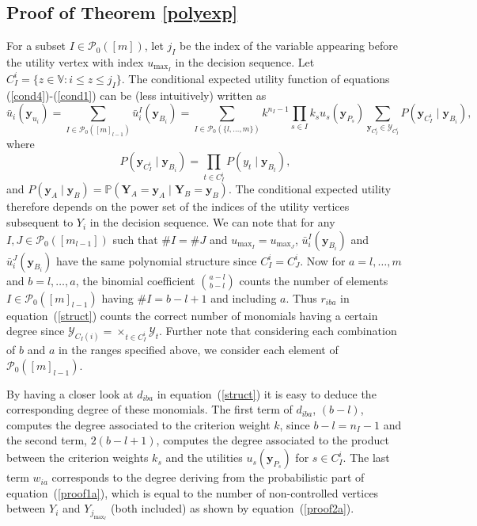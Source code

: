 \subsection{Proof of Theorem \ref{polyexp}}
\label{proof:polyexp}
For a subset $I\in \mathcal{P}_0([m])$, let $j_I$ be the index of the variable appearing before the utility vertex with index $u_{\max_{I}}$ in the decision sequence. Let $C_I^i=\{z\in\mathbb{V}:i\leq z\leq j_I\}$. The conditional expected utility function  of equations (\ref{cond4})-(\ref{cond1}) can be (less intuitively) written as
\begin{equation}
\label{proof1a}
\bar{u}_i(\bm{y}_{u_i})=\sum_{I\in \mathcal{P}_0([m]_{l-1})}\bar{u}_i^I(\bm{y}_{B_i})=\sum_{I\in \mathcal{P}_0(\{l,\dots,m\})}k^{n_I-1}\prod_{s\in I}k_su_s(\bm{y}_{P_s})\sum_{\bm{y}_{C_I^i}\in\bm{\mathcal{Y}}_{C_I^i}}P(\bm{y}_{C_I^i}\;|\;\bm{y}_{B_i}),
\end{equation}
where
\begin{equation}
\label{proof2a}
P(\bm{y}_{C_I^i}\;|\;\bm{y}_{B_i})=\prod_{t\in C_I^i}P(y_t\;|\;\bm{y}_{B_t}),
\end{equation}
and $P(\bm{y}_A\;|\;\bm{y}_B)=\mathbb{P}(\bm{Y}_A=\bm{y}_A\;|\;\bm{Y}_B=\bm{y}_B)$.
The conditional expected utility therefore depends on the power set of the indices of the utility vertices subsequent to $Y_i$ in the decision sequence. We can note that for any $I,J\in \mathcal{P}_0([m_{l-1}])$ such that $\# I=\# J$ and $u_{\max_{I}}=u_{\max_{J}}$, $\bar{u}_i^I(\bm{y}_{B_i})$ and $\bar{u}^J_i(\bm{y}_{B_i})$ have the same polynomial structure since $C_I^i=C_J^i$. Now for $a=l,\dots,m$ and $b=l,\dots,a$, the binomial coefficient $\binom{a-l}{b-l}$ counts the number of elements $I\in\mathcal{P}_0([m]_{l-1})$ having $\# I=b-l+1$ and including $a$. Thus $r_{iba}$ in equation~(\ref{struct}) counts the correct number of monomials having a certain degree since $\bm{\mathcal{Y}}_{C_I(i)}=\times_{t\in C_I^i}\mathcal{Y}_t$. Further note that considering each combination of $b$ and $a$ in the ranges specified above, we consider each element of $\mathcal{P}_0([m]_{l-1})$.

 By having a closer look at $d_{iba}$ in equation~(\ref{struct}) it is easy to deduce the corresponding degree of these monomials. The first term of $d_{iba}$, $(b-l)$, computes the degree associated to the criterion weight $k$, since $b-l=n_I-1$ and the second term, $2(b-l+1)$, computes the degree associated to the product between the criterion weights $k_s$ and the utilities $u_s(\bm{y}_{P_s})$ for $s\in C_I^i$. The last term $w_{ia}$ corresponds to the degree deriving from the probabilistic part of equation~(\ref{proof1a}), which is equal to the number of non-controlled vertices between $Y_i$  and $Y_{j_{\max_{I}}}$ (both included) as shown by equation~(\ref{proof2a}).

